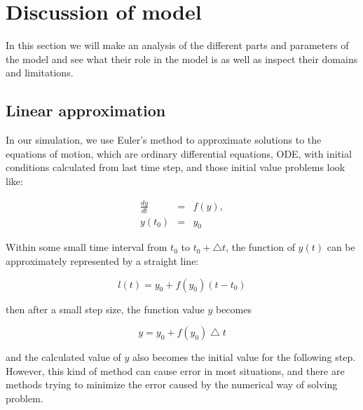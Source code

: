 \section{Discussion of model}
\label{sec:discussion}
In this section we will make an analysis of the different parts and 
parameters of the model and see what their role in the model is as well 
as inspect their domains and limitations. 


\subsection{Linear approximation}
In our simulation, we use Euler's method to approximate solutions to the equations of motion, 
which are ordinary differential equations, ODE, with initial conditions calculated from last time step, 
and those initial value problems look like:

\begin{eqnarray}
\frac{dy}{dt} &=& f(y),\\
y(t_{0}) &=& y_{0}
\end{eqnarray}

Within some small time interval from $t_{0}$ to $t_{0}+\bigtriangleup t$, the function of $ y(t) $ 
can be approximately represented by a straight line:

\begin{equation}
l(t) = y_{0} + f(y_{0}) (t-t_{0})
\end{equation}

then after a small step size, the function value $ y $ becomes

\begin{equation}
y = y_{0} + f(y_{0}) \bigtriangleup t
\end{equation}

and the calculated value of $ y $ also becomes the initial value for the following step. 
However, this kind of method can cause error in most situations, and there are methods trying 
to minimize the error caused by the numerical way of solving problem.\\

